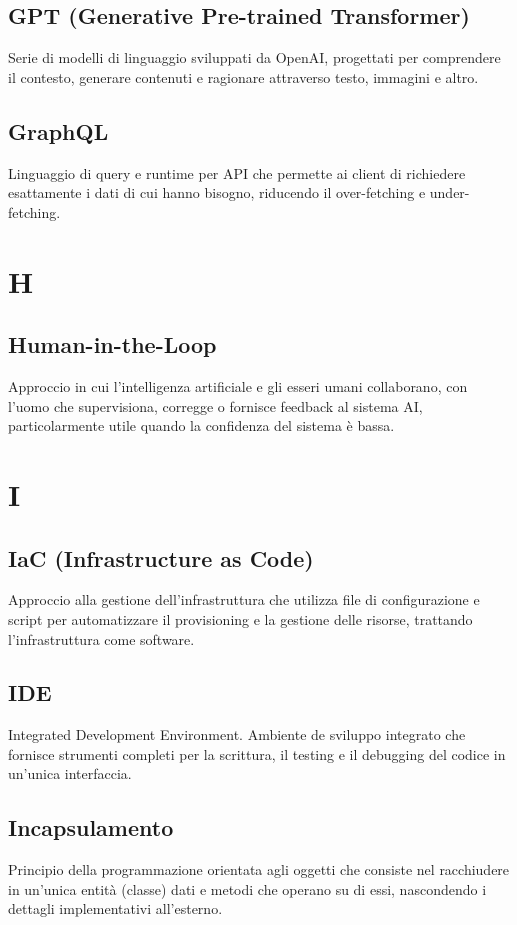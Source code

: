 \documentclass[a4paper,11pt]{article}
\begin{document}
\subsection{GPT (Generative Pre-trained Transformer)}
Serie di modelli di linguaggio sviluppati da OpenAI, progettati per comprendere il contesto, generare contenuti e ragionare attraverso testo, immagini e altro.

\subsection{GraphQL}
Linguaggio di query e runtime per API che permette ai client di richiedere esattamente i dati di cui hanno bisogno, riducendo il over-fetching e under-fetching.

\newpage
\section{H}

\subsection{Human-in-the-Loop}
Approccio in cui l'intelligenza artificiale e gli esseri umani collaborano, con l'uomo che supervisiona, corregge o fornisce feedback al sistema AI, particolarmente utile quando la confidenza del sistema è bassa.

\newpage
\section{I}

\subsection{IaC (Infrastructure as Code)}
Approccio alla gestione dell'infrastruttura che utilizza file di configurazione e script per automatizzare il provisioning e la gestione delle risorse, trattando l'infrastruttura come software.

\subsection{IDE}
Integrated Development Environment. Ambiente de sviluppo integrato che fornisce strumenti completi per la scrittura, il testing e il debugging del codice in un'unica interfaccia.

\subsection{Incapsulamento}
Principio della programmazione orientata agli oggetti che consiste nel racchiudere in un'unica entità (classe) dati e metodi che operano su di essi, nascondendo i dettagli implementativi all'esterno.
\end{document}
